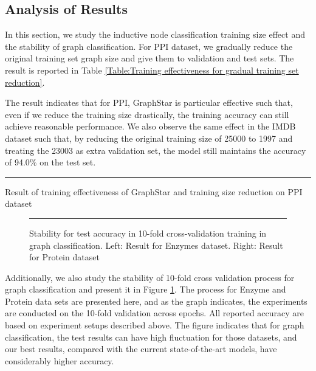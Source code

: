 \documentclass{article}
\begin{document}
\subsection{Analysis of Results}
In this section, we study the inductive node classification training size effect and the stability of graph classification. For PPI dataset, we gradually reduce the original training set graph size and give them to validation and test sets. The result is reported in Table \ref{Table:Training effectiveness for gradual training set reduction}. 

The result indicates that for PPI, GraphStar is particular effective such that, even if we reduce the training size drastically, the training accuracy can still achieve reasonable performance. We also observe the same effect in the IMDB dataset such that, by reducing the original training size of 25000 to 1997 and treating the 23003 as extra validation set, the model still maintains the accuracy of 94.0\% on the test set. 

\begin{table}[!ht]
\centering
{}
\rule{\linewidth}{0cm}
\caption{\label{Table:Training effectiveness for gradual training set reduction} Result of training effectiveness of GraphStar and training size reduction on PPI dataset}
\end{table}

\begin{figure}[!ht]
\centering
{}
\rule{\linewidth}{0cm}
\caption{\label{Figure:Analysis for test accuracy trends in 10-fold cross validation for Enzymes and Protein} Stability for test accuracy in 10-fold cross-validation training in graph classification. Left: Result for Enzymes dataset. Right: Result for Protein dataset}
\end{figure}

Additionally, we also study the stability of 10-fold cross validation process for graph classification and present it in Figure \ref{Figure:Analysis for test accuracy trends in 10-fold cross validation for Enzymes and Protein}. The process for Enzyme and Protein data sets are presented here, and as the graph indicates, the experiments are conducted on the 10-fold validation across epochs. All reported accuracy are based on experiment setups described above. The figure indicates that for graph classification, the test results can have high fluctuation for those datasets, and our best results, compared with the current state-of-the-art models, have considerably higher accuracy.
\end{document}
